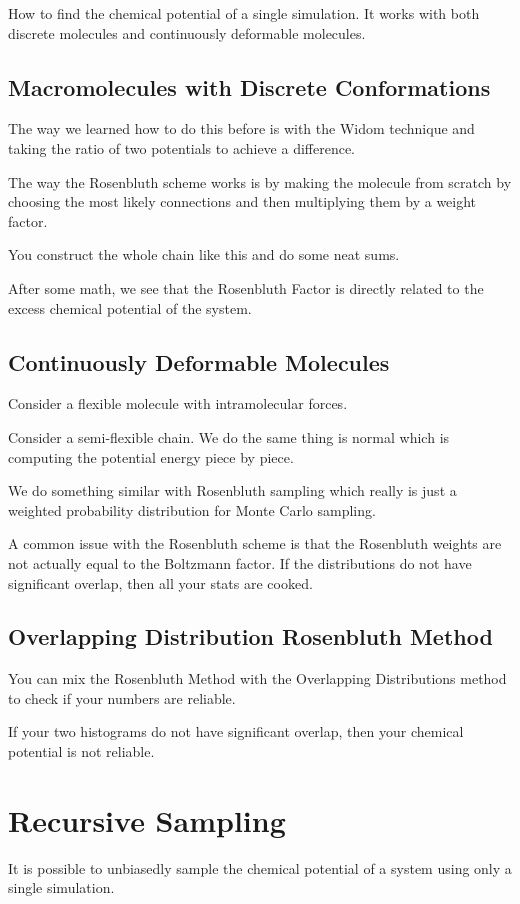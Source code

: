 \documentclass[fleqn]{report}
\begin{document}
How to find the chemical potential of a single simulation. 
It works with both discrete molecules and continuously deformable molecules. 

\subsection{Macromolecules with Discrete Conformations}
The way we learned how to do this before is with the Widom technique 
and taking the ratio of two potentials to achieve a difference. 

The way the Rosenbluth scheme works is by making the molecule from scratch 
by choosing the most likely connections and then multiplying them by a weight 
factor. 

You construct the whole chain like this and do some neat sums. 

After some math, we see that the Rosenbluth Factor is directly related 
to the excess chemical potential of the system. 

\subsection{Continuously Deformable Molecules}
Consider a flexible molecule with intramolecular forces. 

Consider a semi-flexible chain. We do the same thing is normal which 
is computing the potential energy piece by piece. 

We do something similar with Rosenbluth sampling which really is just 
a weighted probability distribution for Monte Carlo sampling. 

A common issue with the Rosenbluth scheme is that the Rosenbluth weights 
are not actually equal to the Boltzmann factor. If the distributions do not 
have significant overlap, then all your stats are cooked. 

\subsection{Overlapping Distribution Rosenbluth Method}
You can mix the Rosenbluth Method with the Overlapping Distributions 
method to check if your numbers are reliable. 

If your two histograms do not have significant overlap, then your chemical 
potential is not reliable. 

\section{Recursive Sampling}
It is possible to unbiasedly sample the chemical potential of a system using only a 
single simulation. 
\end{document}
